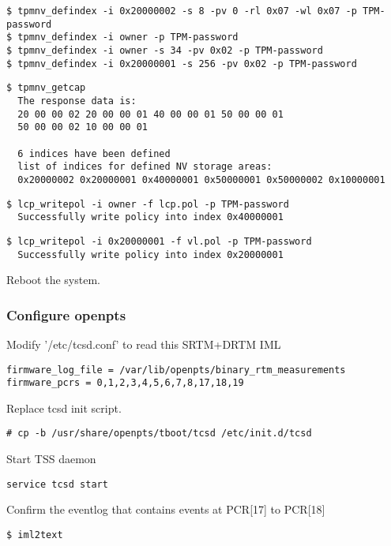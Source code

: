 \begin{lstlisting}[style=source_code]
$ tpmnv_defindex -i 0x20000002 -s 8 -pv 0 -rl 0x07 -wl 0x07 -p TPM-password
$ tpmnv_defindex -i owner -p TPM-password
$ tpmnv_defindex -i owner -s 34 -pv 0x02 -p TPM-password
$ tpmnv_defindex -i 0x20000001 -s 256 -pv 0x02 -p TPM-password
\end{lstlisting}

\begin{lstlisting}[style=source_code]
$ tpmnv_getcap
  The response data is:
  20 00 00 02 20 00 00 01 40 00 00 01 50 00 00 01 
  50 00 00 02 10 00 00 01 

  6 indices have been defined
  list of indices for defined NV storage areas:
  0x20000002 0x20000001 0x40000001 0x50000001 0x50000002 0x10000001
\end{lstlisting}

\begin{lstlisting}[style=source_code]
$ lcp_writepol -i owner -f lcp.pol -p TPM-password
  Successfully write policy into index 0x40000001 
\end{lstlisting}

\begin{lstlisting}[style=source_code]
$ lcp_writepol -i 0x20000001 -f vl.pol -p TPM-password
  Successfully write policy into index 0x20000001
\end{lstlisting}
Reboot the system.

\subsubsection{Configure openpts}

Modify '/etc/tcsd.conf' to read this SRTM+DRTM IML
\begin{lstlisting}[style=source_code]
firmware_log_file = /var/lib/openpts/binary_rtm_measurements
firmware_pcrs = 0,1,2,3,4,5,6,7,8,17,18,19
\end{lstlisting}
Replace tcsd init script.
\begin{lstlisting}[style=source_code]
# cp -b /usr/share/openpts/tboot/tcsd /etc/init.d/tcsd
\end{lstlisting}

Start TSS daemon
\begin{lstlisting}[style=source_code]
service tcsd start
\end{lstlisting}
Confirm the eventlog that contains events at PCR[17] to PCR[18]
\begin{lstlisting}[style=source_code]
$ iml2text
\end{lstlisting}

